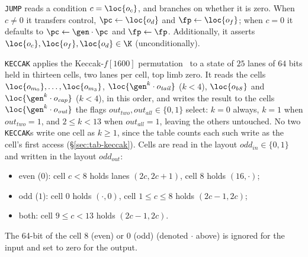 \vspace{5mm}


\texttt{JUMP} reads a condition $c=\loc{o_c}$, and branches on whether it is zero. When $c\neq0$ it transfers control, $\pc\gets\loc{o_d}$ and $\fp\gets\loc{o_f}$; when $c=0$ it defaults to $\pc\gets\gen\cdot\pc$ and $\fp\gets\fp$. Additionally, it asserts $\loc{o_c},\loc{o_f}, \loc{o_d} \in \K$ (unconditionally).

\vspace{5mm}

\texttt{KECCAK} applies the Keccak-$f[1600]$ permutation~\cite{keccak} to a state of $25$ lanes of $64$ bits held in thirteen cells, two lanes per cell, top limb zero. It reads the cells $\loc{o_{m_0}},\dots,\loc{o_{m_3}}$, $\loc{\gen^k\cdot o_{\mathit{tail}}}$ ($k<4$), $\loc{o_{\mathit{b8}}}$ and $\loc{\gen^k\cdot o_{\mathit{cap}}}$ ($k<4$), in this order, and writes the result to the cells $\loc{\gen^k\cdot o_{\mathit{out}}}$ the flags $\mathit{out}_{\mathit{two}},\mathit{out}_{\mathit{all}}\in\{0,1\}$ select: $k=0$ always, $k=1$ when $\mathit{out}_{\mathit{two}}=1$, and $2\le k<13$ when $\mathit{out}_{\mathit{all}}=1$, leaving the others untouched. No two \texttt{KECCAK}s write one cell as $k\ge1$, since the table counts each such write as the cell's first access (\S\ref{sec:tab-keccak}). Cells are read in the layout $\mathit{odd}_{\mathit{in}}\in\{0,1\}$ and written in the layout $\mathit{odd}_{\mathit{out}}$:
\begin{itemize}
\item even ($0$): cell $c<8$ holds lanes $(2c,2c+1)$, cell $8$ holds $(16,\cdot)$;
\item odd ($1$): cell $0$ holds $(\cdot,0)$, cell $1\le c\le8$ holds $(2c-1,2c)$;
\item both: cell $9\le c<13$ holds $(2c-1,2c)$.
\end{itemize}
The 64-bit of the cell 8 (even) or 0 (odd) (denoted $\cdot$ above) is ignored for the input and set to zero for the output.


